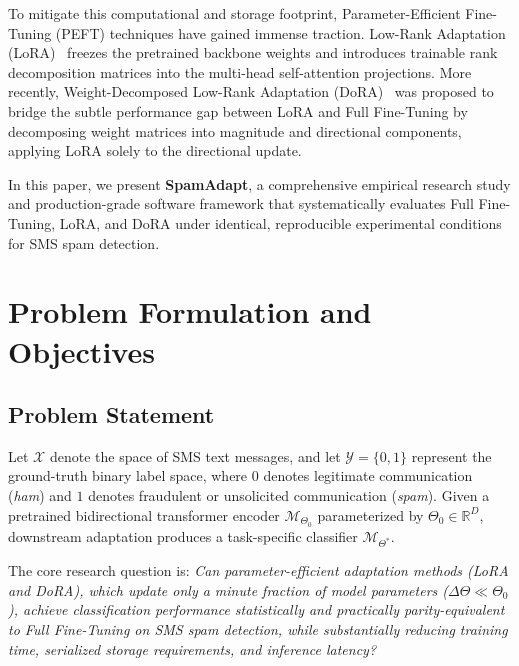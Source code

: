 \documentclass[conference]{IEEEtran}
\begin{document}
To mitigate this computational and storage footprint, Parameter-Efficient Fine-Tuning (PEFT) techniques have gained immense traction. Low-Rank Adaptation (LoRA)~\cite{hu2022lora} freezes the pretrained backbone weights and introduces trainable rank decomposition matrices into the multi-head self-attention projections. More recently, Weight-Decomposed Low-Rank Adaptation (DoRA)~\cite{liu2024dora} was proposed to bridge the subtle performance gap between LoRA and Full Fine-Tuning by decomposing weight matrices into magnitude and directional components, applying LoRA solely to the directional update.

In this paper, we present \textbf{SpamAdapt}, a comprehensive empirical research study and production-grade software framework that systematically evaluates Full Fine-Tuning, LoRA, and DoRA under identical, reproducible experimental conditions for SMS spam detection.

\section{Problem Formulation and Objectives}
\label{sec:problem_objectives}

\subsection{Problem Statement}
Let $\mathcal{X}$ denote the space of SMS text messages, and let $\mathcal{Y} = \{0, 1\}$ represent the ground-truth binary label space, where $0$ denotes legitimate communication (\textit{ham}) and $1$ denotes fraudulent or unsolicited communication (\textit{spam}). Given a pretrained bidirectional transformer encoder $\mathcal{M}_{\Theta_0}$ parameterized by $\Theta_0 \in \mathbb{R}^D$, downstream adaptation produces a task-specific classifier $\mathcal{M}_{\Theta^*}$. 

The core research question is: \textit{Can parameter-efficient adaptation methods (LoRA and DoRA), which update only a minute fraction of model parameters ($\Delta \Theta \ll \Theta_0$), achieve classification performance statistically and practically parity-equivalent to Full Fine-Tuning on SMS spam detection, while substantially reducing training time, serialized storage requirements, and inference latency?}
\end{document}
